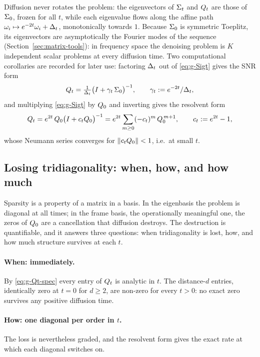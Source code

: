 Diffusion never rotates the problem: the eigenvectors of $\Sigma_t$ and
$Q_t$ are those of $\Sigma_0$, frozen for all $t$, while each eigenvalue
flows along the affine path $\omega_i \mapsto e^{-2t}\omega_i + \Delta_t$,
monotonically towards $1$. Because $\Sigma_0$ is symmetric Toeplitz, its
eigenvectors are asymptotically the Fourier modes of the sequence
(Section~\ref{sec:matrix-tools}): in frequency space the denoising problem is $K$
independent scalar problems at every diffusion time. Two computational
corollaries are recorded for later use: factoring $\Delta_t$ out of
\eqref{eq:g-Sigt} gives the SNR form
\begin{equation}
  Q_t = \tfrac{1}{\Delta_t} \big( I + \gamma_t\, \Sigma_0 \big)^{-1},
  \qquad \gamma_t := e^{-2t}/\Delta_t ,
  \label{eq:g-Qt-snr}
\end{equation}
and multiplying \eqref{eq:g-Sigt} by $Q_0$ and inverting gives the
resolvent form
\begin{equation}
  Q_t = e^{2t}\, Q_0 \big( I + c_t Q_0 \big)^{-1}
      = e^{2t} \sum_{m \geq 0} (-c_t)^m\, Q_0^{\,m+1},
  \qquad c_t := e^{2t} - 1 ,
  \label{eq:g-Qt-res}
\end{equation}
whose Neumann series converges for $\|c_t Q_0\| < 1$, i.e.\ at small $t$.

\subsection{Losing tridiagonality: when, how, and how much}
\label{sec:g-tridiag-loss}

Sparsity is a property of a matrix in a basis. In the eigenbasis the
problem is diagonal at all times; in the frame basis, the operationally
meaningful one, the zeros of $Q_0$ are a cancellation that diffusion
destroys. The destruction is quantifiable, and it answers three questions:
when tridiagonality is lost, how, and how much structure survives at
each $t$.

\paragraph{When: immediately.} By \eqref{eq:g-Qt-spec} every entry of
$Q_t$ is analytic in $t$. The distance-$d$ entries, identically zero at
$t = 0$ for $d \geq 2$, are non-zero for every $t > 0$: no exact zero
survives any positive diffusion time.

\paragraph{How: one diagonal per order in $t$.} The loss is nevertheless
graded, and the resolvent form gives the exact rate at which each diagonal
switches on.

